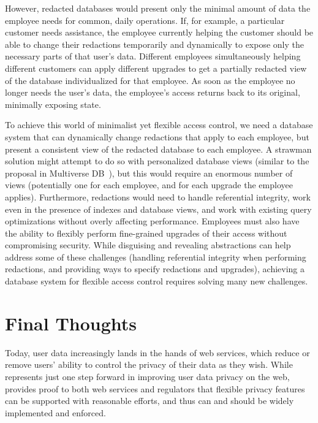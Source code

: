 %
However, redacted databases would present only the minimal amount of data the
employee needs for common, daily operations. If, for example, a particular
customer needs assistance, the employee currently helping the customer should be
able to change their redactions temporarily and dynamically to expose only the
necessary parts of that user's data.
%
Different employees simultaneously helping different customers can apply
different upgrades to get a partially redacted view of the database
individualized for that employee.
%
As soon as the employee no longer needs the user's data, the employee’s access
returns back to its original, minimally exposing state.

%
To achieve this world of minimalist yet flexible access control, we need a database
system that can dynamically change redactions that apply to each employee, but
present a consistent view of the redacted database to each employee. A strawman
solution might attempt to do so with personalized database views (similar to the
proposal in Multiverse DB~\cite{multiverse}), but this would require an enormous
number of views (potentially one for each employee, and for each upgrade the
employee applies).
%
Furthermore, redactions would need to handle referential integrity, work even in
the presence of indexes and database views, and work with existing query
optimizations without overly affecting performance.
%
Employees must also have the ability to flexibly perform fine-grained upgrades
of their access without compromising security.
%
While disguising and revealing abstractions can help address some of these
challenges (\eg handling referential integrity when performing redactions, and
providing ways to specify redactions and upgrades), achieving a database system
for flexible access control requires solving many new challenges.

\section{Final Thoughts}
Today, user data increasingly lands in the hands of web services, which reduce
or remove users' ability to control the privacy of their data as they wish.
%
While \sys represents just one step forward in improving user data privacy on
the web, \sys provides proof to both web services and regulators that flexible
privacy features can be supported with reasonable efforts, and thus can and
should be widely implemented and enforced.
%
